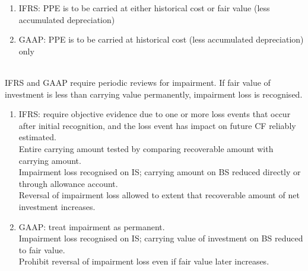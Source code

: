 \begin{remark} 
\begin{enumerate}[label=\roman*.]
\setlength{\itemsep}{0pt}
\item IFRS: PPE is to be carried at either historical cost or fair value (less accumulated depreciation)
\item GAAP: PPE is to be carried at historical cost (less accumulated depreciation) only
\end{enumerate}
\end{remark}

\begin{method} \\
IFRS and GAAP require periodic reviews for impairment. If fair value of investment is less than carrying value permanently, impairment loss is recognised.
\begin{enumerate}[label=\roman*.]
\setlength{\itemsep}{0pt}
\item IFRS: require objective evidence due to one or more loss events that occur after initial recognition, and the loss event has impact on future CF reliably estimated.\\
Entire carrying amount tested by comparing recoverable amount with carrying amount.\\
Impairment loss recognised on IS; carrying amount on BS reduced directly or through allowance account.\\
Reversal of impairment loss allowed to extent that recoverable amount of net investment increases.
\item GAAP: treat impairment as permanent.\\
Impairment loss recognised on IS; carrying value of investment on BS reduced to fair value.\\
Prohibit reversal of impairment loss even if fair value later increases.
\end{enumerate}
\end{method}

